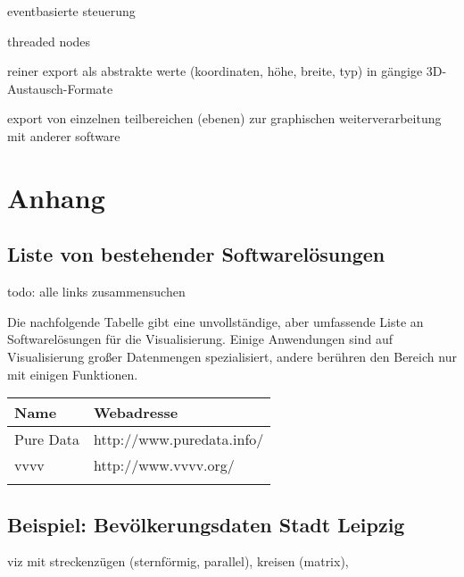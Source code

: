 \documentclass[a4paper, 12pt, DIVcalc, onepage, pdftex, headsepline, footsepline]{scrreprt}
\begin{document}
eventbasierte steuerung

threaded nodes

reiner export als abstrakte werte (koordinaten, höhe, breite, typ) in gängige 3D-Austausch-Formate

export von einzelnen teilbereichen (ebenen) zur graphischen weiterverarbeitung mit anderer software

\chapter{Anhang}
\section{Liste von bestehender Softwarelösungen}
todo: alle links zusammensuchen

Die nachfolgende Tabelle gibt eine unvollständige, aber umfassende
Liste an Softwarelösungen für die Visualisierung. Einige Anwendungen
sind auf Visualisierung großer Datenmengen spezialisiert, andere
berühren den Bereich nur mit einigen Funktionen.

\begin{tabular}{l|l}
\hline
Name & Webadresse \\
\hline
Pure Data & http://www.puredata.info/ \\
vvvv & http://www.vvvv.org/ \\
\label{tab:Softwareliste}
\end{tabular}
\section{Beispiel: Bevölkerungsdaten Stadt Leipzig}
viz mit streckenzügen (sternförmig, parallel), kreisen (matrix),


\listoftables
\listoffigures
\end{document}
